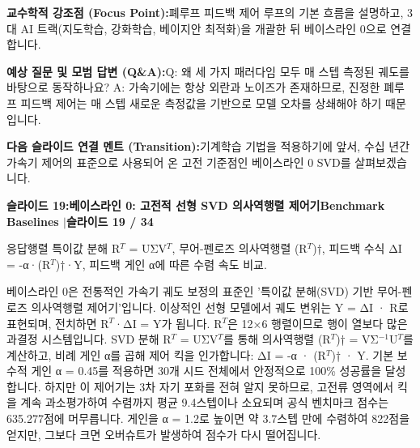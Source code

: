 \documentclass[11pt,a4paper]{article}
\begin{document}
\begin{tcolorbox}[colback=lightbg,colframe=bordergray,left=6pt,right=6pt,top=3pt,bottom=3pt,boxrule=0.6pt,arc=2.5pt]
\small
\noindent\textbf{\color{navy}교수학적 강조점 (Focus Point):}\enspace 폐루프 피드백 제어 루프의 기본 흐름을 설명하고, 3대 AI 트랙(지도학습, 강화학습, 베이지안 최적화)을 개괄한 뒤 베이스라인 0으로 연결합니다.\par\vspace{0.3em}
\noindent\textbf{\color{successgreen}예상 질문 및 모범 답변 (Q\&A):}\enspace Q: 왜 세 가지 패러다임 모두 매 스텝 측정된 궤도를 바탕으로 동작하나요? A: 가속기에는 항상 외란과 노이즈가 존재하므로, 진정한 폐루프 피드백 제어는 매 스텝 새로운 측정값을 기반으로 모델 오차를 상쇄해야 하기 때문입니다.\par\vspace{0.3em}
\noindent\textbf{\color{accent}다음 슬라이드 연결 멘트 (Transition):}\enspace 기계학습 기법을 적용하기에 앞서, 수십 년간 가속기 제어의 표준으로 사용되어 온 고전 기준점인 베이스라인 0 SVD를 살펴보겠습니다.
\end{tcolorbox}
\clearpage
\hypertarget{slide.19}{}
{}
\noindent\begin{tcolorbox}[colback=navy,colframe=navy,left=6pt,right=6pt,top=3pt,bottom=3pt,boxrule=0pt,arc=2pt]
{\large\bfseries\color{white}슬라이드 19:\enspace 베이스라인 0: 고전적 선형 SVD 의사역행렬 제어기}\hfill{\footnotesize\bfseries\color{white!85!lightbg}Benchmark Baselines \enspace$|$\enspace 슬라이드 19 / 34}
\end{tcolorbox}
\vspace{0.2em}
\begin{tcolorbox}[colback=lightbg,colframe=bordergray,title={\footnotesize\bfseries\color{darkgray}슬라이드 시각 구성 요약},fontupper=\small,left=6pt,right=6pt,top=2.5pt,bottom=2.5pt,boxrule=0.6pt,arc=2.5pt]
응답행렬 특이값 분해 R$^T$ = UΣV$^T$, 무어-펜로즈 의사역행렬 (R$^T$)†, 피드백 수식 ΔI = -α·(R$^T$)†·Y, 피드백 게인 α에 따른 수렴 속도 비교.
\end{tcolorbox}
\vspace{0.2em}
\begin{tcolorbox}[colback=white,colframe=primaryblue,title={\footnotesize\bfseries\color{white}발표자 구두 대본 (Spoken Script)},fontupper=\small,left=6pt,right=6pt,top=3pt,bottom=3pt,boxrule=0.8pt,arc=2.5pt]
베이스라인 0은 전통적인 가속기 궤도 보정의 표준인 '특이값 분해(SVD) 기반 무어-펜로즈 의사역행렬 제어기'입니다. 이상적인 선형 모델에서 궤도 변위는 Y = ΔI · R로 표현되며, 전치하면 R$^T$·ΔI = Y가 됩니다. R$^T$은 12×6 행렬이므로 행이 열보다 많은 과결정 시스템입니다. SVD 분해 R$^T$ = UΣV$^T$를 통해 의사역행렬 (R$^T$)† = VΣ$^{-1}$U$^T$를 계산하고, 비례 게인 α를 곱해 제어 킥을 인가합니다: ΔI = -α · (R$^T$)† · Y. 기본 보수적 게인 α = 0.45를 적용하면 30개 시드 전체에서 안정적으로 100\% 성공률을 달성합니다. 하지만 이 제어기는 3차 자기 포화를 전혀 알지 못하므로, 고전류 영역에서 킥을 계속 과소평가하여 수렴까지 평균 9.4스텝이나 소요되며 공식 벤치마크 점수는 635.277점에 머무릅니다. 게인을 α = 1.2로 높이면 약 3.7스텝 만에 수렴하여 822점을 얻지만, 그보다 크면 오버슈트가 발생하여 점수가 다시 떨어집니다.
\end{tcolorbox}
\end{document}
